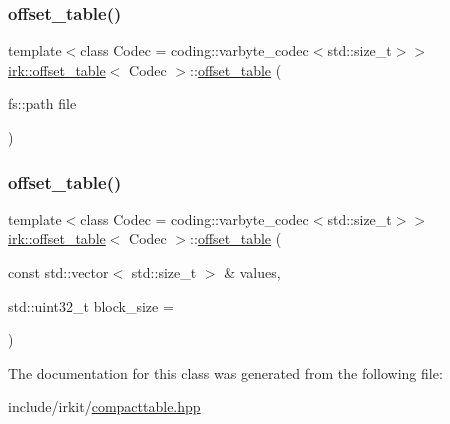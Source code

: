 \subsubsection{\texorpdfstring{offset\+\_\+table()}{offset\_table()}\hspace{0.1cm}{\footnotesize\ttfamily [1/2]}}
{\footnotesize\ttfamily template$<$class Codec = coding\+::varbyte\+\_\+codec$<$std\+::size\+\_\+t$>$$>$ \\
\mbox{\hyperlink{classirk_1_1offset__table}{irk\+::offset\+\_\+table}}$<$ Codec $>$\+::\mbox{\hyperlink{classirk_1_1offset__table}{offset\+\_\+table}} (\begin{DoxyParamCaption}\item[{fs\+::path}]{file }\end{DoxyParamCaption})\hspace{0.3cm}{\ttfamily [inline]}}

\mbox{\label{classirk_1_1offset__table_ab4e9bad8dff1f4a9c5d37d6735b62598}} 
\subsubsection{\texorpdfstring{offset\+\_\+table()}{offset\_table()}\hspace{0.1cm}{\footnotesize\ttfamily [2/2]}}
{\footnotesize\ttfamily template$<$class Codec = coding\+::varbyte\+\_\+codec$<$std\+::size\+\_\+t$>$$>$ \\
\mbox{\hyperlink{classirk_1_1offset__table}{irk\+::offset\+\_\+table}}$<$ Codec $>$\+::\mbox{\hyperlink{classirk_1_1offset__table}{offset\+\_\+table}} (\begin{DoxyParamCaption}\item[{const std\+::vector$<$ std\+::size\+\_\+t $>$ \&}]{values,  }\item[{std\+::uint32\+\_\+t}]{block\+\_\+size = {} }\end{DoxyParamCaption})\hspace{0.3cm}{\ttfamily [inline]}}



The documentation for this class was generated from the following file\+:\begin{DoxyCompactItemize}
\item 
include/irkit/\mbox{\hyperlink{compacttable_8hpp}{compacttable.\+hpp}}\end{DoxyCompactItemize}
